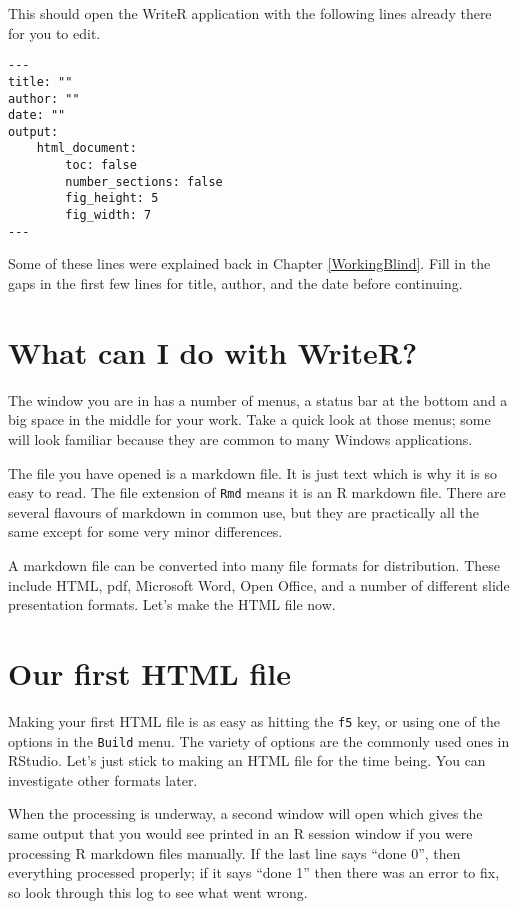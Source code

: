 \documentclass[
]{book}
\begin{document}
This should open the WriteR application with the following lines already there for you to edit.

\begin{verbatim}
---
title: ""
author: ""
date: ""
output:
    html_document:
        toc: false
        number_sections: false
        fig_height: 5
        fig_width: 7
--- 
\end{verbatim}

Some of these lines were explained back in Chapter \ref{WorkingBlind}. Fill in the gaps in the first few lines for title, author, and the date before continuing.

\hypertarget{what-can-i-do-with-writer}{%
\section{What can I do with WriteR?}\label{what-can-i-do-with-writer}}

The window you are in has a number of menus, a status bar at the bottom and a big space in the middle for your work. Take a quick look at those menus; some will look familiar because they are common to many Windows applications.

The file you have opened is a markdown file. It is just text which is why it is so easy to read. The file extension of \texttt{Rmd} means it is an R markdown file. There are several flavours of markdown in common use, but they are practically all the same except for some very minor differences.

A markdown file can be converted into many file formats for distribution. These include HTML, pdf, Microsoft Word, Open Office, and a number of different slide presentation formats. Let's make the HTML file now.

\hypertarget{our-first-html-file}{%
\section{Our first HTML file}\label{our-first-html-file}}

Making your first HTML file is as easy as hitting the \texttt{f5} key, or using one of the options in the \texttt{Build} menu. The variety of options are the commonly used ones in RStudio. Let's just stick to making an HTML file for the time being. You can investigate other formats later.

When the processing is underway, a second window will open which gives the same output that you would see printed in an R session window if you were processing R markdown files manually.
If the last line says ``done 0'', then everything processed properly; if it says ``done 1'' then there was an error to fix, so look through this log to see what went wrong.
\end{document}
